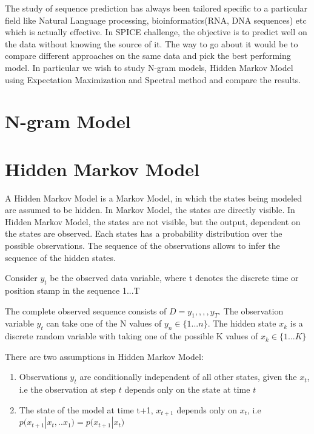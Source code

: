 \documentclass{article} %
\begin{document}
The study of sequence prediction has always been tailored specific to a particular field like Natural Language processing, bioinformatics(RNA, DNA sequences) etc which is actually effective. In SPICE challenge, the objective is to predict well on the data without knowing the source of it. The way to go about it would be to compare different approaches on the same data and pick the best performing model. In particular we wish to study N-gram models, Hidden Markov Model using Expectation Maximization and Spectral method and compare the results.

\section{N-gram Model}
\label{N-Gram Model}

\section{Hidden Markov Model}
\label{HMM}

A Hidden Markov Model is a Markov Model, in which the states being modeled are assumed to be hidden. In Markov Model, the states are directly visible. In Hidden Markov Model, the states are not visible, but the output, dependent on the states are observed. Each states has a probability distribution over the possible observations. The sequence of the observations allows to infer the sequence of the hidden states. 

Consider \(y_t\) be the observed data variable, where t denotes the discrete time or position stamp in the sequence 1...T

The complete observed sequence consists of \(D ={y_1,,,,y_T}\). The observation variable $y_t$ can take one of the N values of \(y_n \in \{1...n\}\). The hidden state \(x_k\) is a discrete random variable with taking one of the possible K values of \(x_k \in \{1...K\}\)

There are two assumptions in Hidden Markov Model:
\begin{enumerate}
\item Observations $y_t$ are conditionally independent of all other states, given the \(x_t\), i.e the observation at step \(t\) depends only on the state at time \(t\)
\item The state of the model at time t+1, \(x_{t+1}\) depends only on \(x_t\), i.e 
\( p\big(x_{t+1}|x_t,..x_1\big) = p\big(x_{t+1}|x_t\big) \)
\end{enumerate}
\end{document}
